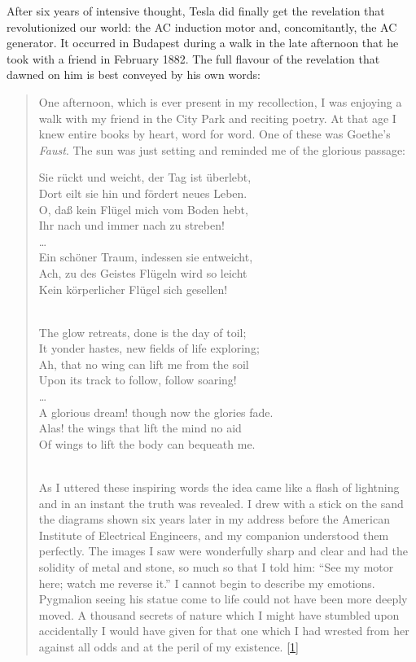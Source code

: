 \documentclass[
  12pt,
  british,
  a4paper,
  rgb,
  dvipsnames,
  svgnames,
  hyphens]{article}
\begin{document}
After six years of intensive thought, Tesla did finally get the
revelation that revolutionized our world: the AC induction motor and,
concomitantly, the AC generator. It occurred in Budapest during a walk
in the late afternoon that he took with a friend in February 1882. The
full flavour of the revelation that dawned on him is best conveyed by
his own words:

\begin{quote}
One afternoon, which is ever present in my recollection, I was enjoying
a walk with my friend in the City Park and reciting poetry. At that age
I knew entire books by heart, word for word. One of these was Goethe's
\emph{Faust}. The sun was just setting and reminded me of the glorious
passage:

Sie rückt und weicht, der Tag ist überlebt,\\
Dort eilt sie hin und fördert neues Leben.\\
O, daß kein Flügel mich vom Boden hebt,\\
Ihr nach und immer nach zu streben!\\
\ldots{}\\
Ein schöner Traum, indessen sie entweicht,\\
Ach, zu des Geistes Flügeln wird so leicht\\
Kein körperlicher Flügel sich gesellen!\\
\strut \\
The glow retreats, done is the day of toil;\\
It yonder hastes, new fields of life exploring;\\
Ah, that no wing can lift me from the soil\\
Upon its track to follow, follow soaring!\\
\ldots{}\\
A glorious dream! though now the glories fade.\\
Alas! the wings that lift the mind no aid\\
Of wings to lift the body can bequeath me.\\
\strut \\

As I uttered these inspiring words the idea came like a flash of
lightning and in an instant the truth was revealed. I drew with a stick
on the sand the diagrams shown six years later in my address before the
American Institute of Electrical Engineers, and my companion understood
them perfectly. The images I saw were wonderfully sharp and clear and
had the solidity of metal and stone, so much so that I told him: ``See
my motor here; watch me reverse it.'' I cannot begin to describe my
emotions. Pygmalion seeing his statue come to life could not have been
more deeply moved. A thousand secrets of nature which I might have
stumbled upon accidentally I would have given for that one which I had
wrested from her against all odds and at the peril of my existence.
\protect\hyperlink{ref-john83}{{[}1{]}}
\end{quote}
\end{document}
